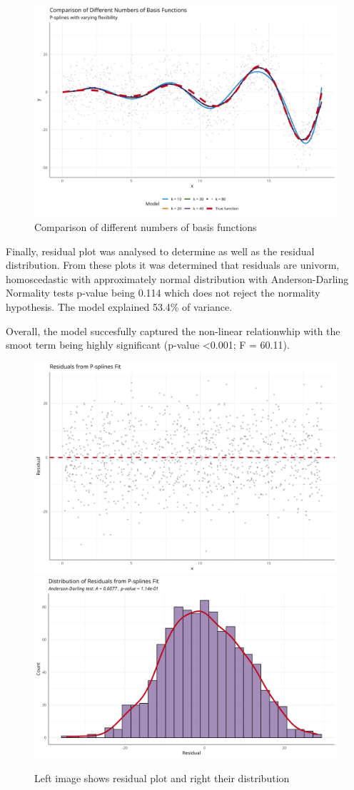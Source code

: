 \documentclass[8pt,twocolumn]{article}
\begin{document}
\begin{figure}[htbp]
    \centering
    \includegraphics[width=0.8\columnwidth]{img1.png}
    \caption{Comparison of different numbers of basis functions}
    \label{fig:your_label}
    \vspace{-10pt}
\end{figure}

Finally, residual plot was analysed to determine as well as the residual distribution. From these plots it was determined that
residuals are univorm, homoscedastic with approximately normal distribution with Anderson-Darling Normality tests p-value being 0.114
which does not reject the normality hypothesis. The model explained 53.4\% of variance.

Overall, the model succesfully captured the non-linear relationwhip with the smoot term being highly significant (p-value <0.001; F = 60.11).

\begin{figure}[htbp]
    \centering
    \includegraphics[width=0.40\columnwidth]{img2.png}
    \includegraphics[width=0.40\columnwidth]{img3.png}
    \caption{Left image shows residual plot and right their distribution}
    \label{fig:both_images}
\end{figure}
\end{document}
